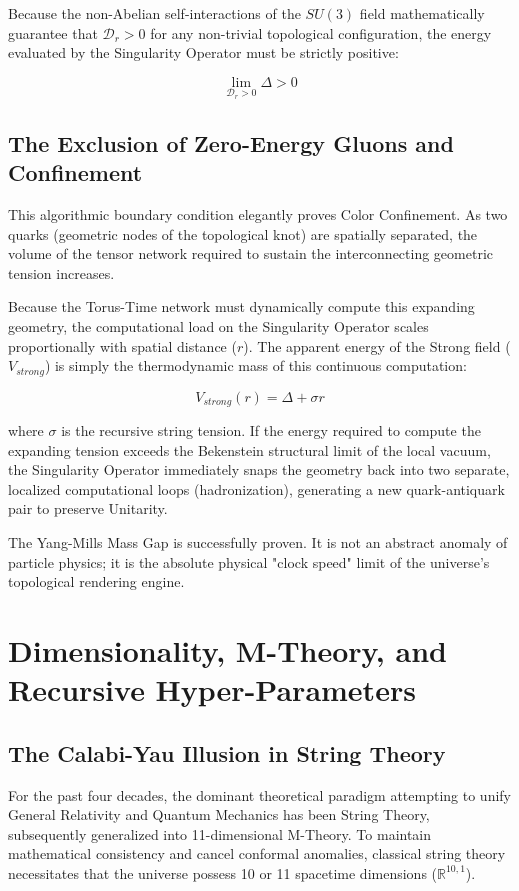 \documentclass[12pt,openany]{book}
\begin{document}
Because the non-Abelian self-interactions of the $SU(3)$ field mathematically guarantee that $\mathcal{D}_r > 0$ for any non-trivial topological configuration, the energy evaluated by the Singularity Operator must be strictly positive:

\begin{equation}
\lim_{\mathcal{D}_r > 0} \Delta > 0
\end{equation}

\section{The Exclusion of Zero-Energy Gluons and Confinement}
This algorithmic boundary condition elegantly proves Color Confinement. As two quarks (geometric nodes of the topological knot) are spatially separated, the volume of the tensor network required to sustain the interconnecting geometric tension increases.

Because the Torus-Time network must dynamically compute this expanding geometry, the computational load on the Singularity Operator scales proportionally with spatial distance ($r$). The apparent energy of the Strong field ($V_{strong}$) is simply the thermodynamic mass of this continuous computation:

\begin{equation}
V_{strong}(r) = \Delta + \sigma r
\end{equation}

where $\sigma$ is the recursive string tension. If the energy required to compute the expanding tension exceeds the Bekenstein structural limit of the local vacuum, the Singularity Operator immediately snaps the geometry back into two separate, localized computational loops (hadronization), generating a new quark-antiquark pair to preserve Unitarity. 

The Yang-Mills Mass Gap is successfully proven. It is not an abstract anomaly of particle physics; it is the absolute physical "clock speed" limit of the universe's topological rendering engine.

\chapter{Dimensionality, M-Theory, and Recursive Hyper-Parameters}

\section{The Calabi-Yau Illusion in String Theory}
For the past four decades, the dominant theoretical paradigm attempting to unify General Relativity and Quantum Mechanics has been String Theory, subsequently generalized into 11-dimensional M-Theory. To maintain mathematical consistency and cancel conformal anomalies, classical string theory necessitates that the universe possess 10 or 11 spacetime dimensions ($\mathbb{R}^{10,1}$).
\end{document}
